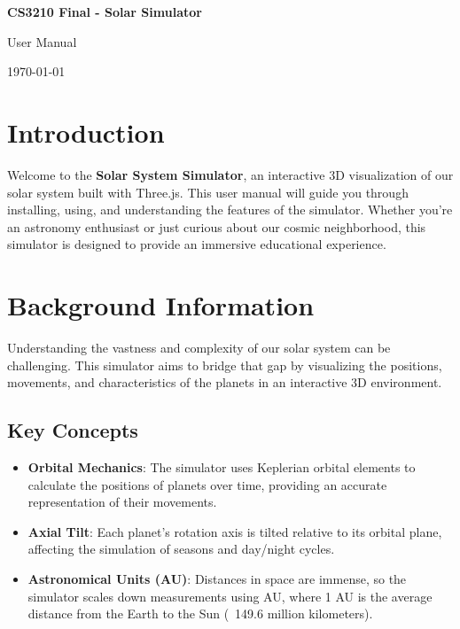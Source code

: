 \documentclass[12pt, a4paper]{article}
\begin{document}
\begin{titlepage}
    \centering
    \vspace*{4cm}
    {\Huge\bfseries CS3210 Final - Solar Simulator \par}
    \vspace{1cm}
    {\Large User Manual \par}
    \vfill
    {\large \today \par}
\end{titlepage}

\tableofcontents
\thispagestyle{empty}
\clearpage

\setcounter{page}{1}

\section{Introduction}

Welcome to the \textbf{Solar System Simulator}, an interactive 3D visualization
of our solar system built with Three.js. This user manual will guide you
through installing, using, and understanding the features of the simulator.
Whether you're an astronomy enthusiast or just curious about our cosmic
neighborhood, this simulator is designed to provide an immersive educational
experience.

\section{Background Information}

Understanding the vastness and complexity of our solar system can be
challenging. This simulator aims to bridge that gap by visualizing the
positions, movements, and characteristics of the planets in an interactive 3D
environment.

\subsection{Key Concepts}

\begin{itemize}
    \item \textbf{Orbital Mechanics}: The simulator uses Keplerian orbital elements to calculate the positions of planets over time, providing an accurate representation of their movements.
    \item \textbf{Axial Tilt}: Each planet's rotation axis is tilted relative to its orbital plane, affecting the simulation of seasons and day/night cycles.
    \item \textbf{Astronomical Units (AU)}: Distances in space are immense, so the simulator scales down measurements using AU, where 1 AU is the average distance from the Earth to the Sun (~149.6 million kilometers).
\end{itemize}
\end{document}
